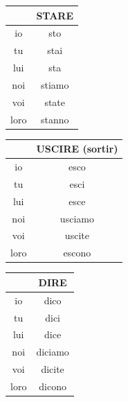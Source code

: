 \documentclass[12pt, openany]{report}
\begin{document}
\begin{minipage}{.33\textwidth}
    \begin{center}
        \begin{tabular}{c||c}
            & STARE\\ \hline
            io & sto\\
            tu & stai\\
            lui & sta\\
            noi & stiamo\\
            voi & state\\
            loro & stanno\\
        \end{tabular}
    \end{center}
\end{minipage}
\begin{minipage}{.33\textwidth}
    \begin{center}
        \begin{tabular}{c||c}
            & USCIRE (sortir)\\ \hline
            io & esco\\
            tu & esci\\
            lui & esce\\
            noi & usciamo\\
            voi & uscite\\
            loro & escono\\
        \end{tabular}
    \end{center}
\end{minipage}
\begin{minipage}{.33\textwidth}
    \begin{center}
        \begin{tabular}{c||c}
            & DIRE\\ \hline
            io & dico\\
            tu & dici\\
            lui & dice\\
            noi & diciamo\\
            voi & dicite\\
            loro & dicono\\
        \end{tabular}
    \end{center}
\end{minipage}
\end{document}
